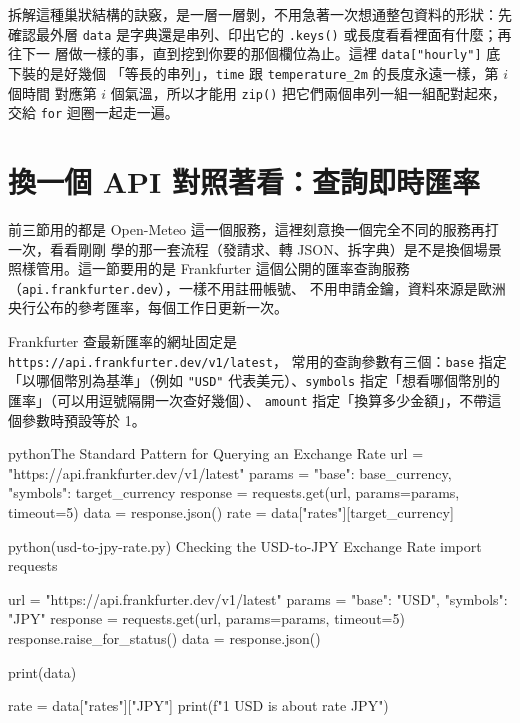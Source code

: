 拆解這種巢狀結構的訣竅，是一層一層剝，不用急著一次想通整包資料的形狀：先確認最外層
\texttt{data} 是字典還是串列、印出它的 \texttt{.keys()} 或長度看看裡面有什麼；再往下一
層做一樣的事，直到挖到你要的那個欄位為止。這裡 \texttt{data["hourly"]} 底下裝的是好幾個
「等長的串列」，\texttt{time} 跟 \texttt{temperature\_2m} 的長度永遠一樣，第 $i$ 個時間
對應第 $i$ 個氣溫，所以才能用 \texttt{zip()} 把它們兩個串列一組一組配對起來，交給
\texttt{for} 迴圈一起走一遍。


\section{換一個 API 對照著看：查詢即時匯率}
\label{sec:currency-api}

前三節用的都是 Open-Meteo 這一個服務，這裡刻意換一個完全不同的服務再打一次，看看剛剛
學的那一套流程（發請求、轉 JSON、拆字典）是不是換個場景照樣管用。這一節要用的是
Frankfurter 這個公開的匯率查詢服務（\texttt{api.frankfurter.dev}），一樣不用註冊帳號、
不用申請金鑰，資料來源是歐洲央行公布的參考匯率，每個工作日更新一次。

Frankfurter 查最新匯率的網址固定是 \texttt{https://api.frankfurter.dev/v1/latest}，
常用的查詢參數有三個：\texttt{base} 指定「以哪個幣別為基準」（例如 \texttt{"USD"}
代表美元）、\texttt{symbols} 指定「想看哪個幣別的匯率」（可以用逗號隔開一次查好幾個）、
\texttt{amount} 指定「換算多少金額」，不帶這個參數時預設等於 1。

\begin{code}{python}{The Standard Pattern for Querying an Exchange Rate}
url = "https://api.frankfurter.dev/v1/latest"
params = {"base": base_currency, "symbols": target_currency}
response = requests.get(url, params=params, timeout=5)
data = response.json()
rate = data["rates"][target_currency]
\end{code}

\begin{example}{python}{(usd-to-jpy-rate.py) Checking the USD-to-JPY Exchange Rate}
import requests

url = "https://api.frankfurter.dev/v1/latest"
params = {"base": "USD", "symbols": "JPY"}
response = requests.get(url, params=params, timeout=5)
response.raise_for_status()
data = response.json()

print(data)

rate = data["rates"]["JPY"]
print(f"1 USD is about {rate} JPY")
\end{example}

